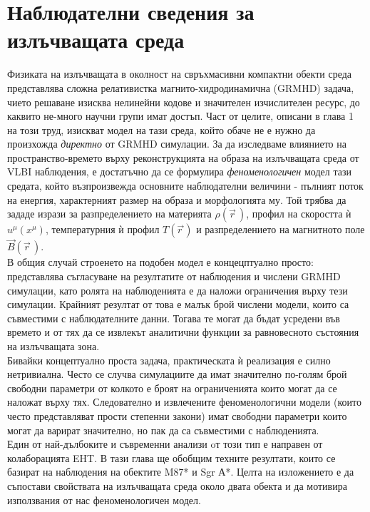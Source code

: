 \section{Наблюдателни сведения за излъчващата среда}
\lfoot{}
Физиката на излъчващата в околност на свръхмасивни компактни обекти среда представлява сложна релативистка магнито-хидродинамична (GRMHD) задача, чието решаване изисква нелинейни кодове и значителен изчислителен ресурс, до каквито не-много научни групи имат достъп. Част от целите, описани в глава 1 на този труд, изискват модел на тази среда, който обаче не е нужно да произхожда \emph{директно} от GRMHD симулации. За да изследваме влиянието на пространство-времето върху реконструкцията на образа на излъчващата среда от VLBI наблюдения, е достатъчно да се формулира \emph{феноменологичен} модел тази средата, който възпроизвежда основните наблюдателни величини - пълният поток на енергия, характерният размер на образа и морфологията му. Той трябва да зададе изрази за разпределението на материята $\rho(\vec{r}\,)$, профил на скоростта ѝ $u^\mu (x^\mu)$, температурния ѝ профил $T(\vec{r\,})$ и разпределението на магнитното поле $\vec{B}(\vec{r}\,)$.\\

В общия случай строенето на подобен модел е концецптуално просто: представлява съгласуване на резултатите от наблюдения и числени GRMHD симулации, като ролята на наблюденията е да наложи ограничения върху тези симулации. Крайният резултат от това е малък брой числени модели, които са съвместими с наблюдателните данни. Тогава те могат да бъдат усредени във времето и от тях да се извлекът аналитични функции за равновесното състояния на излъчващата зона.\\ 

Бивайки концептуално проста задача, практическата ѝ реализация е силно нетривиална. Често се случва симулациите да имат значително по-голям брой свободни параметри от колкото е броят на ограниченията които могат да се наложат върху тях. Следователно и извлечените феноменологични модели (които често представляват прости степенни закони) имат свободни параметри които могат да варират значително, но пак да са съвместими с наблюденията.\\

Един от най-дълбоките и съвременни анализи oт този тип е направен от колаборацията EHT. В тази глава ще обобщим техните резултати, които се базират на наблюдения на обектите M87* и Sgr А*. Целта на изложението е да съпостави свойствата на излъчващата среда около двата обекта и да мотивира използвания от нас феноменологичен модел.
\newpage
